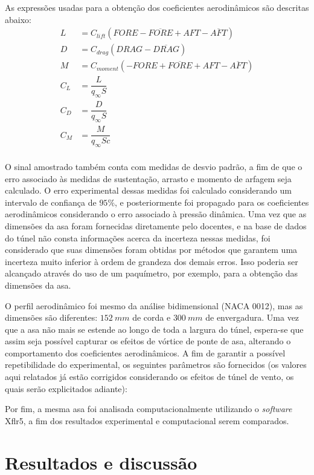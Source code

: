 As expressões usadas para a obtenção dos coeficientes aerodinâmicos são descritas abaixo:
\begin{align}
    L&=C_{lift}(FORE-\overline{FORE}+AFT-\overline{AFT})\\
    D&=C_{drag}(DRAG-\overline{DRAG})\\
    M&=C_{moment}(-FORE+\overline{FORE}+AFT-\overline{AFT})\\
    C_L&=\dfrac{L}{q_{\infty}S}\\
    C_D&=\dfrac{D}{q_{\infty}S}\\
    C_M&=\dfrac{M}{q_{\infty}Sc}\\
\end{align}

O sinal amostrado também conta com medidas de desvio padrão, a fim de que o erro associado às medidas de sustentação, arrasto e momento de arfagem seja calculado. O erro experimental dessas medidas foi calculado considerando um intervalo de confiança de $95\%$, e posteriormente foi propagado para os coeficientes aerodinâmicos considerando o erro associado à pressão dinâmica. Uma vez que as dimensões da asa foram fornecidas diretamente pelo docentes, e na base de dados do túnel não consta informações acerca da incerteza nessas medidas, foi considerado que suas dimensões foram obtidas por métodos que garantem uma incerteza muito inferior à ordem de grandeza dos demais erros. Isso poderia ser alcançado através do uso de um paquímetro, por exemplo, para a obtenção das dimensões da asa.

O perfil aerodinâmico foi mesmo da análise bidimensional (NACA 0012), mas as dimensões são diferentes: $152\ mm$ de corda e $300\ mm$ de envergadura. Uma vez que a asa não mais se estende ao longo de toda a largura do túnel, espera-se que assim seja possível capturar os efeitos de vórtice de ponte de asa, alterando o comportamento dos coeficientes aerodinâmicos. A fim de garantir a possível repetibilidade do experimental, os seguintes parâmetros são fornecidos (os valores aqui relatados já estão corrigidos considerando os efeitos de túnel de vento, os quais serão explicitados adiante):

Por fim, a mesma asa foi analisada computacionalmente utilizando o \textit{software} Xflr5, a fim dos resultados experimental e computacional serem comparados.



\section{Resultados e discussão}

